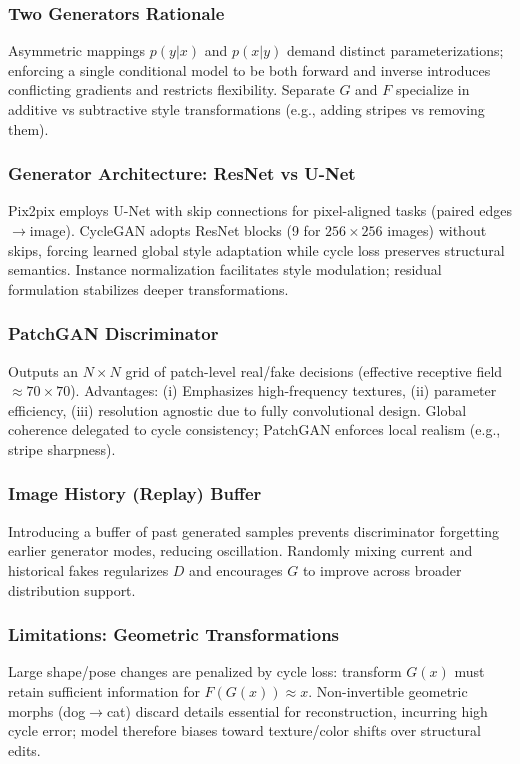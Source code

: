 \documentclass[11pt]{article}
\begin{document}
\subsubsection{Two Generators Rationale} Asymmetric mappings $p(y|x)$ and $p(x|y)$ demand distinct parameterizations; enforcing a single conditional model to be both forward and inverse introduces conflicting gradients and restricts flexibility. Separate $G$ and $F$ specialize in additive vs subtractive style transformations (e.g., adding stripes vs removing them).

\subsubsection{Generator Architecture: ResNet vs U-Net} Pix2pix employs U-Net with skip connections for pixel-aligned tasks (paired edges$\to$image). CycleGAN adopts ResNet blocks (9 for $256\times256$ images) without skips, forcing learned global style adaptation while cycle loss preserves structural semantics. Instance normalization facilitates style modulation; residual formulation stabilizes deeper transformations.

\subsubsection{PatchGAN Discriminator} Outputs an $N\times N$ grid of patch-level real/fake decisions (effective receptive field $\approx 70\times70$). Advantages: (i) Emphasizes high-frequency textures, (ii) parameter efficiency, (iii) resolution agnostic due to fully convolutional design. Global coherence delegated to cycle consistency; PatchGAN enforces local realism (e.g., stripe sharpness).

\subsubsection{Image History (Replay) Buffer} Introducing a buffer of past generated samples prevents discriminator forgetting earlier generator modes, reducing oscillation. Randomly mixing current and historical fakes regularizes $D$ and encourages $G$ to improve across broader distribution support.

\subsubsection{Limitations: Geometric Transformations} Large shape/pose changes are penalized by cycle loss: transform $G(x)$ must retain sufficient information for $F(G(x)) \approx x$. Non-invertible geometric morphs (dog$\to$cat) discard details essential for reconstruction, incurring high cycle error; model therefore biases toward texture/color shifts over structural edits.
\end{document}
